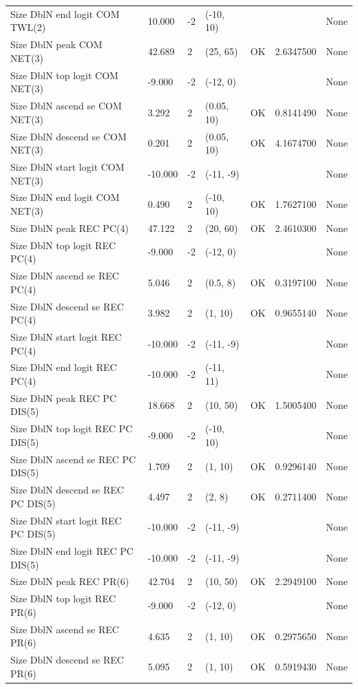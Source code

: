 \documentclass[
  english,
  a4paper,
]{article}
\begin{document}
\begin{landscape}
\begin{longtable}[t]{>{\raggedright\arraybackslash}p{8.5cm}lllll>{\raggedright\arraybackslash}p{4cm}}
Size DblN end logit COM TWL(2) & 10.000 & -2 & (-10, 10) &  &  & None\\
Size DblN peak COM NET(3) & 42.689 & 2 & (25, 65) & OK & 2.6347500 & None\\
Size DblN top logit COM NET(3) & -9.000 & -2 & (-12, 0) &  &  & None\\
Size DblN ascend se COM NET(3) & 3.292 & 2 & (0.05, 10) & OK & 0.8141490 & None\\
Size DblN descend se COM NET(3) & 0.201 & 2 & (0.05, 10) & OK & 4.1674700 & None\\
Size DblN start logit COM NET(3) & -10.000 & -2 & (-11, -9) &  &  & None\\
Size DblN end logit COM NET(3) & 0.490 & 2 & (-10, 10) & OK & 1.7627100 & None\\
Size DblN peak REC PC(4) & 47.122 & 2 & (20, 60) & OK & 2.4610300 & None\\
Size DblN top logit REC PC(4) & -9.000 & -2 & (-12, 0) &  &  & None\\
Size DblN ascend se REC PC(4) & 5.046 & 2 & (0.5, 8) & OK & 0.3197100 & None\\
Size DblN descend se REC PC(4) & 3.982 & 2 & (1, 10) & OK & 0.9655140 & None\\
Size DblN start logit REC PC(4) & -10.000 & -2 & (-11, -9) &  &  & None\\
Size DblN end logit REC PC(4) & -10.000 & -2 & (-11, 11) &  &  & None\\
Size DblN peak REC PC DIS(5) & 18.668 & 2 & (10, 50) & OK & 1.5005400 & None\\
Size DblN top logit REC PC DIS(5) & -9.000 & -2 & (-10, 10) &  &  & None\\
Size DblN ascend se REC PC DIS(5) & 1.709 & 2 & (1, 10) & OK & 0.9296140 & None\\
Size DblN descend se REC PC DIS(5) & 4.497 & 2 & (2, 8) & OK & 0.2711400 & None\\
Size DblN start logit REC PC DIS(5) & -10.000 & -2 & (-11, -9) &  &  & None\\
Size DblN end logit REC PC DIS(5) & -10.000 & -2 & (-11, -9) &  &  & None\\
Size DblN peak REC PR(6) & 42.704 & 2 & (10, 50) & OK & 2.2949100 & None\\
Size DblN top logit REC PR(6) & -9.000 & -2 & (-12, 0) &  &  & None\\
Size DblN ascend se REC PR(6) & 4.635 & 2 & (1, 10) & OK & 0.2975650 & None\\
Size DblN descend se REC PR(6) & 5.095 & 2 & (1, 10) & OK & 0.5919430 & None\\

\end{longtable}
\end{landscape}
\end{document}
